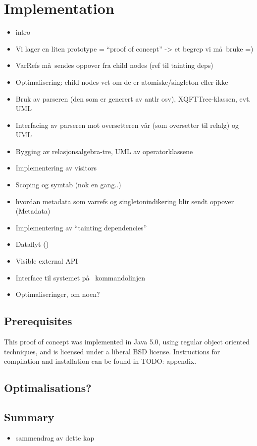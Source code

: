 \chapter{Implementation}
\label{chapter:implementation}

\begin{itemize}
  \item intro
  \item Vi lager en liten prototype = ``proof of concept'' -> et begrep vi m\aa~bruke =)
  \item VarRefs m\aa~sendes oppover fra child nodes (ref til tainting deps)
  \item Optimalisering: child nodes vet om de er atomiske/singleton eller ikke
\end{itemize}

\begin{itemize}
  \item Bruk av parseren (den som er generert av antlr osv), XQFTTree-klassen,
  evt. UML
  \item Interfacing av parseren mot oversetteren v\aa r (som oversetter til
  relalg) og UML
  \item Bygging av relasjonsalgebra-tre, UML av operatorklassene
  \item Implementering av visitors
  \item Scoping og symtab (nok en gang..)
  \item hvordan metadata som varrefs og singletonindikering blir sendt oppover
  (Metadata)
  \item Implementering av ``tainting dependencies''
  \item Dataflyt ()
  \item Visible external API
  \item Interface til systemet p\aa~ kommandolinjen
  \item Optimaliseringer, om noen? 
\end{itemize}

\section{Prerequisites}
This proof of concept was implemented in Java 5.0, using regular object
oriented techniques, and is licensed under a liberal BSD license. Instructions
for compilation and installation can be found in TODO: appendix.












\section{Optimalisations?}

\section{Summary}
\label{sect:impl:summary}
\begin{itemize}
  \item sammendrag av dette kap
\end{itemize}